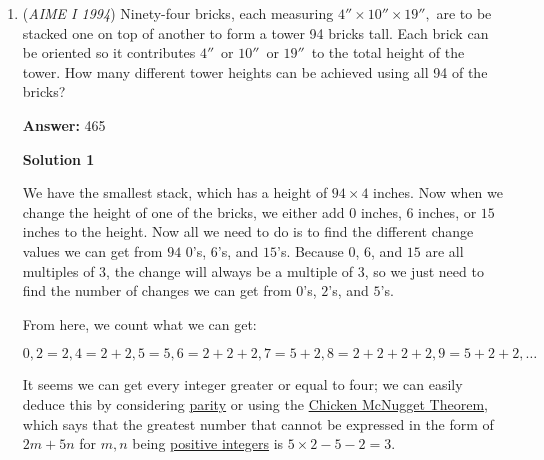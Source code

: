 \begin{enumerate}
 



\textbf{Solution 3}

Using similar right triangles, we identify that $CD = \sqrt{AD \cdot BD}$. Let $AD$ be $29 \cdot k^2$, to avoid too many radicals, getting $CD = k \cdot 29^2$. Next we know that $AC = \sqrt{AB \cdot AD}$ and that $BC = \sqrt{AB \cdot BD}$. Applying the logic with the established values of k, we get $AC = 29k \cdot \sqrt{29^2 + k^2}$ and $BC = 29^2 \cdot \sqrt{29^2 + k^2}$. Next we look to the integer requirement. Since $k$ is both outside and inside square roots, we know it must be an integer to keep all sides as integers. Let $y$ be $\sqrt{29^2 + k^2}$, thus $29^2 = y^2 - k^2$, and $29^2 = (y + k)(y - k)$. Since $29$ is prime, and $k$ cannot be zero, we find $k = 420$ and $y = 421$ as the smallest integers satisfying this quadratic Diophantine equation. Then, since $cos B$ = $\frac{29}{\sqrt{29^2 + k^2}}$. Plugging in we get $cos B = \frac{29}{421}$, thus our answer is $\boxed{450}$.

 


	\item (\textit{AIME I 1994}) Ninety-four bricks, each measuring $4''\times10''\times19'',$ are to be stacked one on top of another to form a tower 94 bricks tall.  Each brick can be oriented so it contributes $4''\,$ or $10''\,$ or $19''\,$ to the total height of the tower.  How many different tower heights can be achieved using all 94 of the bricks?


 
 \textbf{Answer: }465



\textbf{Solution 1}

We have the smallest stack, which has a height of $94 \times 4$ inches. Now when we change the height of one of the bricks, we either add $0$ inches, $6$ inches, or $15$ inches to the height. Now all we need to do is to find the different change values we can get from $94$ $0$'s, $6$'s, and $15$'s. Because $0$, $6$, and $15$ are all multiples of $3$, the change will always be a multiple of $3$, so we just need to find the number of changes we can get from $0$'s, $2$'s, and $5$'s.

 From here, we count what we can get:

 
 \[0, 2 = 2, 4 = 2+2, 5 = 5, 6 = 2+2+2, 7 = 5+2, 8 = 2+2+2+2, 9 = 5+2+2, \ldots\]

 It seems we can get every integer greater or equal to four; we can easily deduce this by considering \href{https://artofproblemsolving.com/wiki/index.php?title=Parity}{parity} or using the \href{https://artofproblemsolving.com/wiki/index.php?title=Chicken\_McNugget\_Theorem}{Chicken McNugget Theorem}, which says that the greatest number that cannot be expressed in the form of $2m + 5n$ for $m,n$ being \href{https://artofproblemsolving.com/wiki/index.php?title=Positive\_integer}{positive integers} is $5 \times 2 - 5 - 2=3$. 


\end{enumerate}
